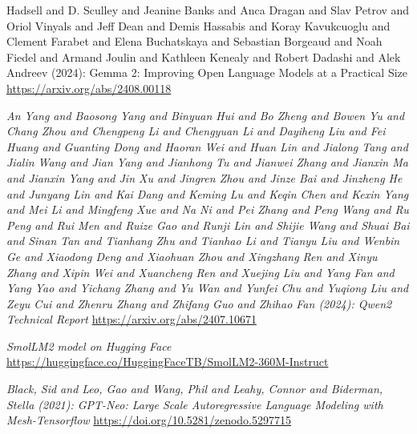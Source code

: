 \documentclass[licencjacka,en]{pracamgr}
\begin{document}
\begin{thebibliography}{99}
{Hadsell and D. Sculley and Jeanine Banks and Anca Dragan and Slav Petrov and Oriol Vinyals and Jeff Dean and Demis Hassabis and Koray Kavukcuoglu and Clement Farabet and Elena Buchatskaya and Sebastian Borgeaud and Noah Fiedel and Armand Joulin and Kathleen Kenealy and Robert Dadashi and Alek Andreev (2024): Gemma 2: Improving Open Language Models at a Practical Size
}
\url{https://arxiv.org/abs/2408.00118}

\textit{An Yang and Baosong Yang and Binyuan Hui and Bo Zheng and Bowen Yu and Chang Zhou and Chengpeng Li and Chengyuan Li and Dayiheng Liu and Fei Huang and Guanting Dong and Haoran Wei and Huan Lin and Jialong Tang and Jialin Wang and Jian Yang and Jianhong Tu and Jianwei Zhang and Jianxin Ma and Jianxin Yang and Jin Xu and Jingren Zhou and Jinze Bai and Jinzheng He and Junyang Lin and Kai Dang and Keming Lu and Keqin Chen and Kexin Yang and Mei Li and Mingfeng Xue and Na Ni and Pei Zhang and Peng Wang and Ru Peng and Rui Men and Ruize Gao and Runji Lin and Shijie Wang and Shuai Bai and Sinan Tan and Tianhang Zhu and Tianhao Li and Tianyu Liu and Wenbin Ge and Xiaodong Deng and Xiaohuan Zhou and Xingzhang Ren and Xinyu Zhang and Xipin Wei and Xuancheng Ren and Xuejing Liu and Yang Fan and Yang Yao and Yichang Zhang and Yu Wan and Yunfei Chu and Yuqiong Liu and Zeyu Cui and Zhenru Zhang and Zhifang Guo and Zhihao Fan (2024): Qwen2 Technical Report}
\url{https://arxiv.org/abs/2407.10671}

\textit{SmolLM2 model on Hugging Face}
\url{https://huggingface.co/HuggingFaceTB/SmolLM2-360M-Instruct}

\textit{Black, Sid and Leo, Gao and Wang, Phil and Leahy, Connor and Biderman, Stella (2021): GPT-Neo: Large Scale Autoregressive Language Modeling with Mesh-Tensorflow}
\url{https://doi.org/10.5281/zenodo.5297715}


\end{thebibliography}
\end{document}
